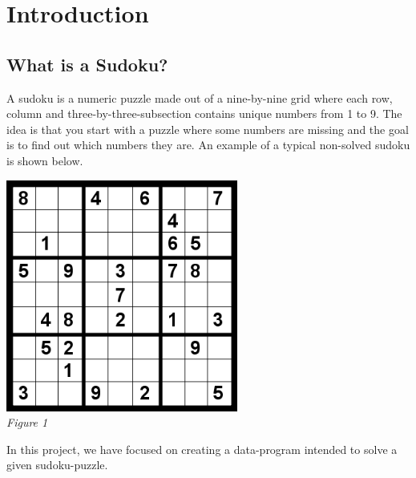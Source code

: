 \documentclass[12pt, a4paper]{article}
\begin{document}
	\section{Introduction}
	\begin{adjustwidth}{2em}{0pt}
		\subsection{What is a Sudoku?}
			\begin{adjustwidth}{3em}{0pt}
				A sudoku is a numeric puzzle made out of a nine-by-nine grid where each row, column and three-by-three-subsection contains unique numbers from 1 to 9. The idea is that you start with a puzzle where some numbers are missing and the goal is to find out which numbers they are. An example of a typical non-solved sudoku is shown below. \\
				\begin{center}
					\includegraphics[width=3in]{puzzle.png} \\ \textit{Figure 1}
				\end{center}

				In this project, we have focused on creating a data-program intended to solve a given sudoku-puzzle.
	  		\end{adjustwidth}
	\end{adjustwidth}
  	\newpage
\end{document}
